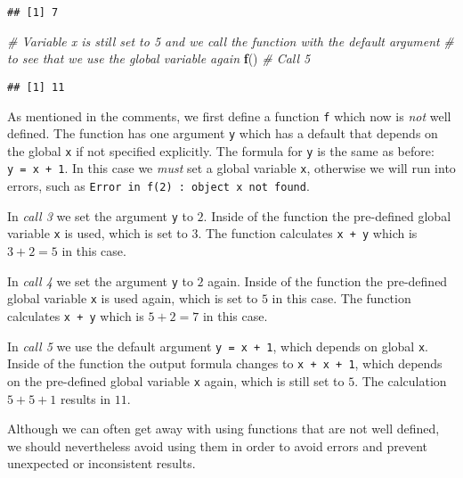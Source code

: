 \documentclass[11,]{article}
\newenvironment{Shaded}{\begin{snugshade}}{\end{snugshade}}
\newcommand{\KeywordTok}[1]{\textcolor[rgb]{0.13,0.29,0.53}{\textbf{{#1}}}}
\newcommand{\CommentTok}[1]{\textcolor[rgb]{0.56,0.35,0.01}{\textit{{#1}}}}
\newcommand{\NormalTok}[1]{{#1}}
\begin{document}
\begin{verbatim}
## [1] 7
\end{verbatim}

\begin{Shaded}
\begin{Highlighting}[]
\CommentTok{# Variable x is still set to 5 and we call the function with the default argument}
\CommentTok{# to see that we use the global variable again}
\KeywordTok{f}\NormalTok{()  }\CommentTok{# Call 5}
\end{Highlighting}
\end{Shaded}

\begin{verbatim}
## [1] 11
\end{verbatim}

As mentioned in the comments, we first define a function \texttt{f}
which now is \emph{not} well defined. The function has one argument
\texttt{y} which has a default that depends on the global \texttt{x} if
not specified explicitly. The formula for \texttt{y} is the same as
before: \texttt{y\ =\ x\ +\ 1}. In this case we \emph{must} set a global
variable \texttt{x}, otherwise we will run into errors, such as
\texttt{Error\ in\ f(2)\ :\ object\ \textquotesingle{}x\textquotesingle{}\ not\ found}.

In \emph{call 3} we set the argument \texttt{y} to \(2\). Inside of the
function the pre-defined global variable \texttt{x} is used, which is
set to \(3\). The function calculates \texttt{x\ +\ y} which is
\(3 + 2 = 5\) in this case.

In \emph{call 4} we set the argument \texttt{y} to \(2\) again. Inside
of the function the pre-defined global variable \texttt{x} is used
again, which is set to \(5\) in this case. The function calculates
\texttt{x\ +\ y} which is \(5 + 2 = 7\) in this case.

In \emph{call 5} we use the default argument \texttt{y\ =\ x\ +\ 1},
which depends on global \texttt{x}. Inside of the function the output
formula changes to \texttt{x\ +\ x\ +\ 1}, which depends on the
pre-defined global variable \texttt{x} again, which is still set to
\(5\). The calculation \(5 + 5 + 1\) results in \(11\).

Although we can often get away with using functions that are not well
defined, we should nevertheless avoid using them in order to avoid
errors and prevent unexpected or inconsistent results.
\end{document}
